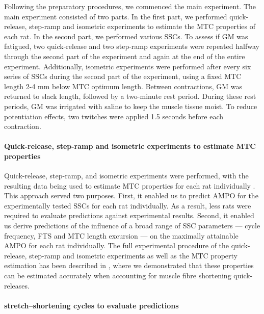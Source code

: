 \documentclass[
  10pt,
  letterpaper,
]{article}
\begin{document}
Following the preparatory procedures, we commenced the main experiment.
The main experiment consisted of two parts. In the first part, we
performed quick-release, step-ramp and isometric experiments to estimate
the MTC properties of each rat. In the second part, we performed various
SSCs. To assess if GM was fatigued, two quick-release and two step-ramp
experiments were repeated halfway through the second part of the
experiment and again at the end of the entire experiment. Additionally,
isometric experiments were performed after every six series of SSCs
during the second part of the experiment, using a fixed MTC length 2-4
mm below MTC optimum length. Between contractions, GM was returned to
slack length, followed by a two-minute rest period. During these rest
periods, GM was irrigated with saline to keep the muscle tissue moist.
To reduce potentiation effects, two twitches were applied 1.5 seconds
before each contraction.

\paragraph{Quick-release, step-ramp and isometric experiments to
estimate MTC
properties}\label{quick-release-step-ramp-and-isometric-experiments-to-estimate-mtc-properties}

Quick-release, step-ramp, and isometric experiments were performed, with
the resulting data being used to estimate MTC properties for each rat
individually \citep[see Figure 3 of][]{reuvers_accuracy_2025}. This
approach served two purposes. First, it enabled us to predict AMPO for
the experimentally tested SSCs for each rat individually. As a result,
less rats were required to evaluate predictions against experimental
results. Second, it enabled us derive predictions of the influence of a
broad range of SSC parameters --- cycle frequency, FTS and MTC length
excursion --- on the maximally attainable AMPO for each rat
individually. The full experimental procedure of the quick-release,
step-ramp and isometric experiments as well as the MTC property
estimation has been described in {\citep{reuvers_accuracy_2025}}, where
we demonstrated that these properties can be estimated accurately when
accounting for muscle fibre shortening quick-releases.

\paragraph{stretch--shortening cycles to evaluate
predictions}\label{stretchshortening-cycles-to-evaluate-predictions}
\end{document}
